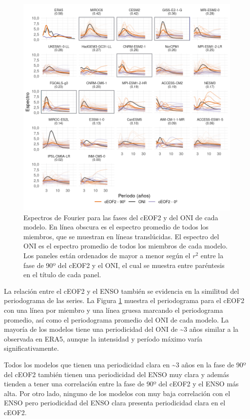 \documentclass[12pt,oneside,a4paper]{reedthesis}
\begin{document}
\begin{figure}

{\centering \includegraphics{figures/50-cmip6/fft-ceof2-1} 

}

\caption{Espectros de Fourier para las fases del cEOF2 y del ONI de cada modelo. En línea obscura es el espectro promedio de todos los miembros, que se muestran en líneas translúcidas. El espectro del ONI es el espectro promedio de todos los miembros de cada modelo. Los paneles están ordenados de mayor a menor según el \(r^2\) entre la fase de 90º del cEOF2 y el ONI, el cual se muestra entre paréntesis en el título de cada panel.}\label{fig:fft-ceof2}
\end{figure}



La relación entre el cEOF2 y el ENSO también se evidencia en la similitud del periodograma de las series.
La Figura \ref{fig:fft-ceof2} muestra el periodograma para el cEOF2 con una línea por miembro y una línea gruesa marcando el periodograma promedio, así como el periodograma promedio del ONI de cada modelo.
La mayoría de los modelos tiene una periodicidad del ONI de \textasciitilde3 años similar a la observada en ERA5, aunque la intensidad y período máximo varía significativamente.

Todos los modelos que tienen una periodicidad clara en \textasciitilde3 años en la fase de 90º del cEOF2 también tienen una periodicidad del ENSO muy clara y además tienden a tener una correlación entre la fase de 90º del cEOF2 y el ENSO más alta.
Por otro lado, ninguno de los modelos con muy baja correlación con el ENSO pero periodicidad del ENSO clara presenta periodicidad clara en el cEOF2.
\end{document}
